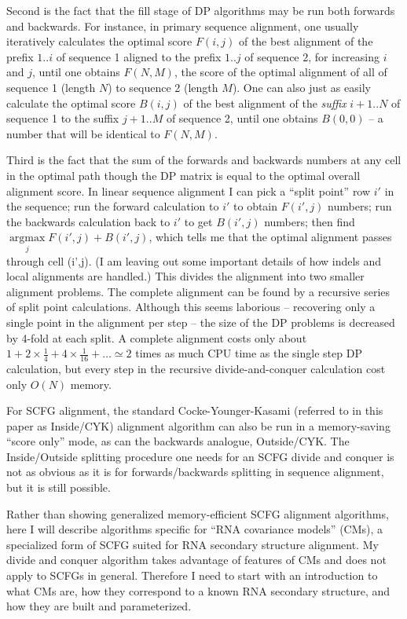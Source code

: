 \documentclass[11pt]{article}
\def\argmax{\mathop{\mathrm{argmax}}\limits}
\begin{document}
Second is the fact that the fill stage of DP algorithms may be run
both forwards and backwards. For instance, in primary sequence
alignment, one usually iteratively calculates the optimal score
$F(i,j)$ of the best alignment of the prefix $1..i$ of sequence 1
aligned to the prefix $1..j$ of sequence 2, for increasing $i$ and
$j$, until one obtains $F(N,M)$, the score of the optimal alignment of
all of sequence 1 (length $N$) to sequence 2 (length $M$). One can
also just as easily calculate the optimal score $B(i,j)$ of the best
alignment of the
\emph{suffix} $i+1..N$ of sequence 1 to the suffix $j+1..M$ of sequence 2,
until one obtains $B(0,0)$ -- a number that will be identical to
$F(N,M)$.

Third is the fact that the sum of the forwards and backwards numbers
at any cell in the optimal path though the DP matrix is equal to the
optimal overall alignment score. In linear sequence alignment I can
pick a ``split point'' row $i'$ in the sequence; run the forward
calculation to $i'$ to obtain $F(i',j)$ numbers; run the backwards
calculation back to $i'$ to get $B(i',j)$ numbers; then find
$\argmax_j F(i',j) + B(i',j)$, which tells me that the optimal
alignment passes through cell (i',j). (I am leaving out some important
details of how indels and local alignments are handled.) This divides
the alignment into two smaller alignment problems. The complete
alignment can be found by a recursive series of split point
calculations. Although this seems laborious -- recovering only a
single point in the alignment per step -- the size of the DP problems
is decreased by 4-fold at each split. A complete alignment costs only
about $1 + 2 \times \frac{1}{4} + 4 \times \frac{1}{16} + \ldots
\simeq 2$ times as much CPU time as the single step DP calculation,
but every step in the recursive divide-and-conquer calculation cost
only $O(N)$ memory.

For SCFG alignment, the standard Cocke-Younger-Kasami (referred to in
this paper as Inside/CYK) alignment algorithm can also be run in a
memory-saving ``score only'' mode, as can the backwards analogue,
Outside/CYK. The Inside/Outside splitting procedure one needs for an
SCFG divide and conquer is not as obvious as it is for
forwards/backwards splitting in sequence alignment, but it is still
possible.

Rather than showing generalized memory-efficient SCFG alignment
algorithms, here I will describe algorithms specific for ``RNA
covariance models'' (CMs), a specialized form of SCFG suited for RNA
secondary structure alignment. My divide and conquer algorithm takes
advantage of features of CMs and does not apply to SCFGs in
general. Therefore I need to start with an introduction to what CMs
are, how they correspond to a known RNA secondary structure, and how
they are built and parameterized.
      
\end{document}
